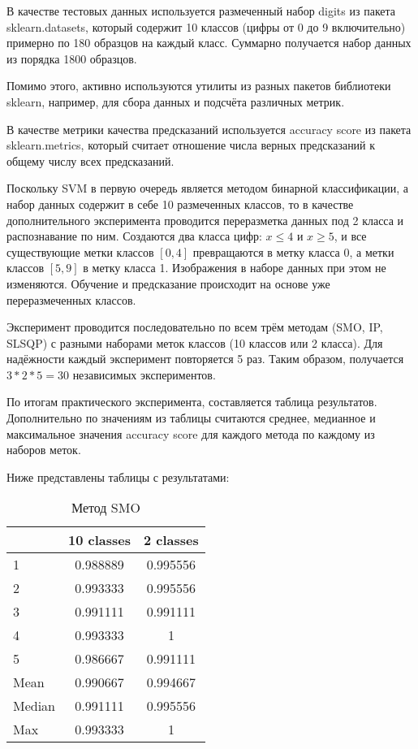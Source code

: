 \documentclass[12pt,a4paper]{article}
\begin{document}
В качестве тестовых данных используется размеченный набор digits из пакета sklearn.datasets, который содержит 10 классов (цифры от 0 до 9 включительно) примерно по 180 образцов на каждый класс. Суммарно получается набор данных из порядка 1800 образцов.

Помимо этого, активно используются утилиты из разных пакетов библиотеки sklearn, например, для сбора данных и подсчёта различных метрик.

В качестве метрики качества предсказаний используется accuracy score из пакета sklearn.metrics, который считает отношение числа верных предсказаний к общему числу всех предсказаний.

Поскольку SVM в первую очередь является методом бинарной классификации, а набор данных содержит в себе 10 размеченных классов, то в качестве дополнительного эксперимента проводится переразметка данных под 2 класса и распознавание по ним. Создаются два класса цифр: $x \leq 4$ и $x \geq 5$, и все существующие метки классов $[0, 4]$ превращаются в метку класса 0, а метки классов $[5, 9]$ в метку класса 1. Изображения в наборе данных при этом не изменяются. Обучение и предсказание происходит на основе уже переразмеченных классов.

Эксперимент проводится последовательно по всем трём методам (SMO, IP, SLSQP) с разными наборами меток классов (10 классов или 2 класса). Для надёжности каждый эксперимент повторяется 5 раз. Таким образом, получается $3 * 2 * 5 = 30$ независимых экспериментов.

По итогам практического эксперимента, составляется таблица результатов. Дополнительно по значениям из таблицы считаются среднее, медианное и максимальное значения accuracy score для каждого метода по каждому из наборов меток.

Ниже представлены таблицы с результатами:

\begin{table}[H]
    \centering
    \begin{tabular}{|l||c|c|}
        \hline
        & 10 classes & 2 classes \\\hline\hline
        1 & 0.988889 & 0.995556 \\\hline
        2 & 0.993333 & 0.995556 \\\hline
        3 & 0.991111 & 0.991111 \\\hline
        4 & 0.993333 & 1 \\\hline
        5 & 0.986667 & 0.991111 \\\hline
        Mean & 0.990667 & 0.994667 \\\hline
        Median & 0.991111 & 0.995556 \\\hline
        Max & 0.993333 & 1 \\\hline
    \end{tabular}
    \caption{Метод SMO}
\end{table}
\end{document}
